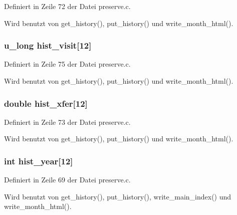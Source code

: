 Definiert in Zeile 72 der Datei preserve.c.

Wird benutzt von get\_\-history(), put\_\-history() und write\_\-month\_\-html().
\subsubsection{\setlength{\rightskip}{0pt plus 5cm}u\_\-long {\bf hist\_\-visit}[12]}\label{preserve_8h_686df2d8a29e5dc08eddd9679fecc5ff}




Definiert in Zeile 75 der Datei preserve.c.

Wird benutzt von get\_\-history(), put\_\-history() und write\_\-month\_\-html().
\subsubsection{\setlength{\rightskip}{0pt plus 5cm}double {\bf hist\_\-xfer}[12]}\label{preserve_8h_9258e499d6896ed681dbe7582d7047c4}




Definiert in Zeile 73 der Datei preserve.c.

Wird benutzt von get\_\-history(), put\_\-history() und write\_\-month\_\-html().
\subsubsection{\setlength{\rightskip}{0pt plus 5cm}int {\bf hist\_\-year}[12]}\label{preserve_8h_bd6905416f4fb7c9cc62053f1f952d32}




Definiert in Zeile 69 der Datei preserve.c.

Wird benutzt von get\_\-history(), put\_\-history(), write\_\-main\_\-index() und write\_\-month\_\-html().